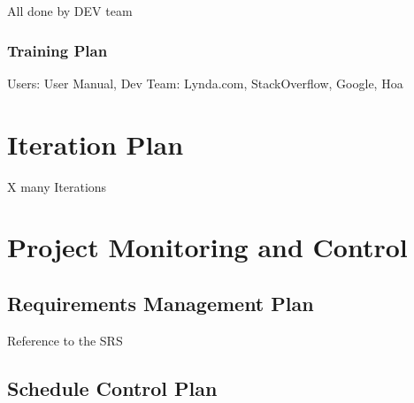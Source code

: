 	All done by DEV team


\subsubsection{Training Plan}

	Users: User Manual, Dev Team: Lynda.com, StackOverflow, Google, Hoa


\section{Iteration Plan}

	X many Iterations


\section{Project Monitoring and Control}


\subsection{Requirements Management Plan}

Reference to the SRS


\subsection{Schedule Control Plan}


